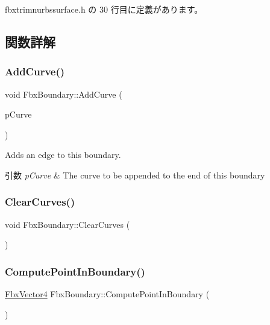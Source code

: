  fbxtrimnurbssurface.\+h の 30 行目に定義があります。



\subsection{関数詳解}
\mbox{\label{class_fbx_boundary_af94f173acd55d7d5f285f8539bbb48e4}} 
\subsubsection{\texorpdfstring{Add\+Curve()}{AddCurve()}}
{\footnotesize\ttfamily void Fbx\+Boundary\+::\+Add\+Curve (\begin{DoxyParamCaption}\item[{\hyperlink{class_fbx_nurbs_curve}{Fbx\+Nurbs\+Curve} $\ast$}]{p\+Curve }\end{DoxyParamCaption})}

Adds an edge to this boundary. 
\begin{DoxyParams}{引数}
{\em p\+Curve} & The curve to be appended to the end of this boundary \\
\hline
\end{DoxyParams}
\mbox{\label{class_fbx_boundary_aa1c12f34cb325c5a337fa383f0860e06}} 
\subsubsection{\texorpdfstring{Clear\+Curves()}{ClearCurves()}}
{\footnotesize\ttfamily void Fbx\+Boundary\+::\+Clear\+Curves (\begin{DoxyParamCaption}{ }\end{DoxyParamCaption})}

\mbox{\label{class_fbx_boundary_a615c36267401342800e00befefa50f6c}} 
\subsubsection{\texorpdfstring{Compute\+Point\+In\+Boundary()}{ComputePointInBoundary()}}
{\footnotesize\ttfamily \hyperlink{class_fbx_vector4}{Fbx\+Vector4} Fbx\+Boundary\+::\+Compute\+Point\+In\+Boundary (\begin{DoxyParamCaption}{ }\end{DoxyParamCaption})}

